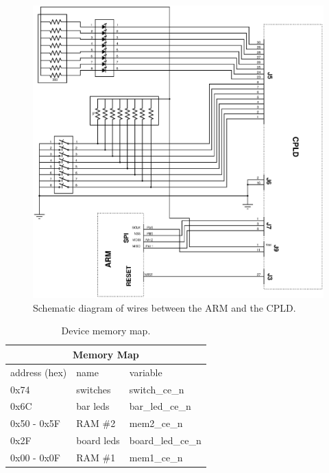 \documentclass{article}
\begin{document}
\begin{figure}
\center
\includegraphics[scale=0.7]{figures/schematics/SPI_LEDs_SW}
\caption{Schematic diagram of wires between the ARM and the CPLD.}
\label{fig:arm_to_cpld}
\end{figure}

\begin{table}[hbp]
\center
\begin{tabular}{|l|l|l|}
    \hline
    \multicolumn{3}{|c|}{\textbf{Memory Map}} \\
    \hline
    address (hex) & name & variable \\
    \hline
    0x74 & switches & switch\_ce\_n \\
    0x6C & bar leds & bar\_led\_ce\_n \\
    0x50 - 0x5F & RAM \#2 & mem2\_ce\_n \\
    0x2F & board leds & board\_led\_ce\_n \\
    0x00 - 0x0F & RAM \#1 & mem1\_ce\_n \\
    \hline
\end{tabular}
\caption{Device memory map.}
\label{tbl:memmap}
\end{table}
\end{document}
